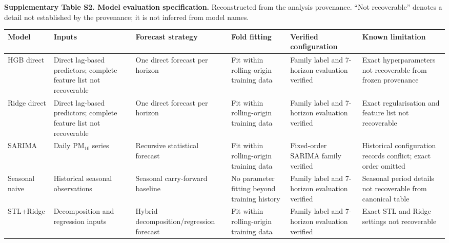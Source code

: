 \begin{table}[ht]
\centering
\scriptsize
\setlength{\tabcolsep}{2pt}
\textbf{Supplementary Table S2. Model evaluation specification.} Reconstructed from the analysis provenance. ``Not recoverable'' denotes a detail not established by the provenance; it is not inferred from model names.\par\smallskip
\begin{tabular}{@{}p{2.15cm}p{2.25cm}p{2.25cm}p{2.05cm}p{2.25cm}p{2.45cm}@{}}
\toprule
Model & Inputs & Forecast strategy & Fold fitting & Verified configuration & Known limitation \\
\midrule
HGB direct & Direct lag-based predictors; complete feature list not recoverable & One direct forecast per horizon & Fit within rolling-origin training data & Family label and 7-horizon evaluation verified & Exact hyperparameters not recoverable from frozen provenance \\
Ridge direct & Direct lag-based predictors; complete feature list not recoverable & One direct forecast per horizon & Fit within rolling-origin training data & Family label and 7-horizon evaluation verified & Exact regularisation and feature list not recoverable \\
SARIMA & Daily PM$_{10}$ series & Recursive statistical forecast & Fit within rolling-origin training data & Fixed-order SARIMA family verified & Historical configuration records conflict; exact order omitted \\
Seasonal naive & Historical seasonal observations & Seasonal carry-forward baseline & No parameter fitting beyond training history & Family label and 7-horizon evaluation verified & Seasonal period details not recoverable from canonical table \\
STL+Ridge & Decomposition and regression inputs & Hybrid decomposition/regression forecast & Fit within rolling-origin training data & Family label and 7-horizon evaluation verified & Exact STL and Ridge settings not recoverable \\
\bottomrule
\end{tabular}
\end{table}
